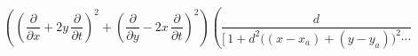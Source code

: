 \[
\left( \left( \frac{\partial}{\partial x} + 2y\,\frac{\partial}{\partial t} \right)^{2}
     + \left( \frac{\partial}{\partial y} - 2x\,\frac{\partial}{\partial t} \right)^{2} \right)
\left( \frac{d}{\bigl[\, 1 + d^{2} \bigl( (x - x_a) + (y - y_a) \bigr)^{2} \cdots} \right.
\]
